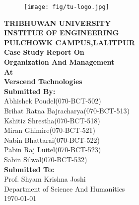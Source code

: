 \begin{titlepage}
\centering
\begin{figure}[h!]
\centering
\texttt{[image: fig/tu-logo.jpg]}
\end{figure}
\vspace{10mm}
{\large\textbf{TRIBHUWAN UNIVERSITY\\
INSTITUE OF ENGINEERING\\
PULCHOWK CAMPUS,LALITPUR\\}}
\vspace{10mm}
\textbf{ Case Study Report On\\
Organization And Management\\
At\\
Verscend Technologies}\\
\vspace{10mm}
\textbf{Submitted By:}\\
Abhishek Poudel(070-BCT-502)\\
Brihat Ratna Bajracharya(070-BCT-513)\\
Kshitiz Shrestha(070-BCT-518)\\
Miran Ghimire(070-BCT-521)\\
Nabin Bhattarai(070-BCT-522)\\
Pabin Raj Luitel(070-BCT-523)\\
Sabin Silwal(070-BCT-532)\\
\vspace{10mm}
\textbf{Submitted To:}\\
Prof. Shyam Krishna Joshi\\
Department of Science And Humanities\\
\vspace{10mm}
\vfill
\today
\end{titlepage}
\cleardoublepage
